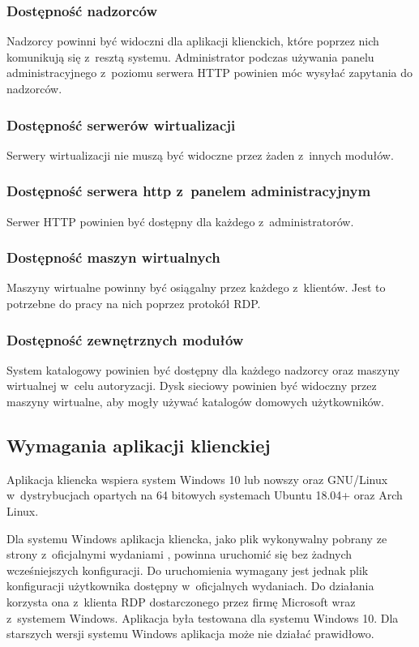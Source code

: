 \documentclass[../opis-rozwiazania.tex]{subfiles}
\begin{document}
\subsubsection{Dostępność nadzorców}
Nadzorcy powinni być widoczni dla aplikacji klienckich, które poprzez nich komunikują się z~resztą systemu.
Administrator podczas używania panelu administracyjnego z~poziomu serwera HTTP powinien móc wysyłać zapytania do nadzorców.

\subsubsection{Dostępność serwerów wirtualizacji}
Serwery wirtualizacji nie muszą być widoczne przez żaden z~innych modułów.

\subsubsection{Dostępność serwera http z~panelem administracyjnym}
Serwer HTTP powinien być dostępny dla każdego z~administratorów.

\subsubsection{Dostępność maszyn wirtualnych}
Maszyny wirtualne powinny być osiągalny przez każdego z~klientów.
Jest to potrzebne do pracy na nich poprzez protokół RDP.

\subsubsection{Dostępność zewnętrznych modułów}
System katalogowy powinien być dostępny dla każdego nadzorcy oraz maszyny wirtualnej w~celu autoryzacji.
Dysk sieciowy powinien być widoczny przez maszyny wirtualne, aby mogły używać katalogów domowych użytkowników.

\subsection{Wymagania aplikacji klienckiej}
Aplikacja kliencka wspiera system Windows 10 lub nowszy oraz GNU/Linux w~dystrybucjach opartych na 64 bitowych systemach Ubuntu 18.04+ oraz Arch Linux.

Dla systemu Windows aplikacja kliencka, jako plik wykonywalny pobrany ze strony z~oficjalnymi wydaniami \parencite{ocd-client-releases}, powinna uruchomić się bez żadnych wcześniejszych konfiguracji. Do uruchomienia wymagany jest jednak plik konfiguracji użytkownika dostępny w~oficjalnych wydaniach.
Do działania korzysta ona z~klienta RDP dostarczonego przez firmę Microsoft wraz z~systemem Windows.
Aplikacja była testowana dla systemu Windows 10.
Dla starszych wersji systemu Windows aplikacja może nie działać prawidłowo.
\end{document}

